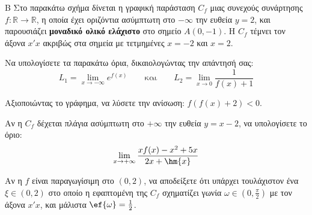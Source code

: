 \begin{thema}{Β}
Στο παρακάτω σχήμα δίνεται η γραφική παράσταση $C_f$ μιας συνεχούς συνάρτησης $f:\mathbb{R}\to\mathbb{R}$, η οποία έχει οριζόντια ασύμπτωτη στο $-\infty$ την ευθεία $y=2$, και παρουσιάζει \textbf{μοναδικό ολικό ελάχιστο} στο σημείο $A(0, -1)$. Η $C_f$ τέμνει τον άξονα $x'x$ ακριβώς στα σημεία με τετμημένες $x=-2$ και $x=2$.

\begin{center}
\end{center}

\begin{erwthma}
  \item Να υπολογίσετε τα παρακάτω όρια, δικαιολογώντας την απάντησή σας:
  \[ L_1 = \lim_{x \to -\infty} e^{f(x)} \qquad \text{και} \qquad L_2 = \lim_{x \to 0} \frac{1}{f(x) + 1} \]
  \item Αξιοποιώντας το γράφημα, να λύσετε την ανίσωση: $f\left( f(x) + 2 \right) < 0$.
  \item Αν η $C_f$ δέχεται πλάγια ασύμπτωτη στο $+\infty$ την ευθεία $y = x - 2$, να υπολογίσετε το όριο:
  \[ \lim_{x \to +\infty} \frac{x f(x) - x^2 + 5x}{2x + \hm{x}} \]
  \item Αν η $f$ είναι παραγωγίσιμη στο $(0, 2)$, να αποδείξετε ότι υπάρχει τουλάχιστον ένα $\xi \in (0, 2)$ στο οποίο η εφαπτομένη της $C_f$ σχηματίζει γωνία $\omega \in \left(0, \frac{\pi}{2}\right)$ με τον άξονα $x'x$, και μάλιστα $\ef{\omega} = \frac{1}{2}$.
\end{erwthma}
\end{thema}

